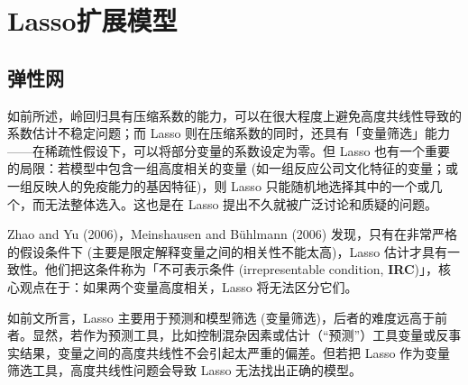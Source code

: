 \section{Lasso扩展模型}

\subsection{弹性网}\label{sec:lasso-enet}
%



如前所述，岭回归具有压缩系数的能力，可以在很大程度上避免高度共线性导致的系数估计不稳定问题；而 Lasso 则在压缩系数的同时，还具有「变量筛选」能力——在稀疏性假设下，可以将部分变量的系数设定为零。但 Lasso 也有一个重要的局限：若模型中包含一组高度相关的变量 (如一组反应公司文化特征的变量；或一组反映人的免疫能力的基因特征)，则 Lasso 只能随机地选择其中的一个或几个，而无法整体选入。这也是在 Lasso 提出不久就被广泛讨论和质疑的问题。

Zhao and Yu (2006)，Meinshausen and Bühlmann (2006) 发现，只有在非常严格的假设条件下 (主要是限定解释变量之间的相关性不能太高)，Lasso 估计才具有一致性。他们把这条件称为「不可表示条件 (irrepresentable condition, \textbf{IRC})」，核心观点在于：如果两个变量高度相关，Lasso 将无法区分它们。

如前文所言，Lasso 主要用于预测和模型筛选 (变量筛选)，后者的难度远高于前者。显然，若作为预测工具，比如控制混杂因素或估计（“预测”）工具变量或反事实结果，变量之间的高度共线性不会引起太严重的偏差。但若把 Lasso 作为变量筛选工具，高度共线性问题会导致 Lasso 无法找出正确的模型。

